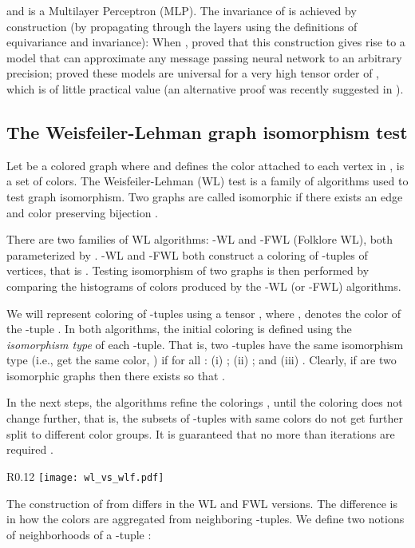 \documentclass{article}
\newcommand{\ie}{{i.e.}}
\begin{document}
and  is a Multilayer Perceptron (MLP). The invariance of  is achieved by construction (by propagating  through the layers using the definitions of equivariance and invariance):  
When , \citet{maron2018invariant} proved that this construction gives rise to a model that can approximate any message passing neural network \citep{Gilmer2017} to an arbitrary precision; \citet{maron2019universality} proved these models are universal for a very high tensor order of , which is of little practical value (an alternative proof was recently suggested in \cite{keriven2019universal}).   




\vspace{-5pt}
\subsection{The Weisfeiler-Lehman graph isomorphism test}\label{ss:WL}
\vspace{-5pt}
Let  be a colored graph where  and  defines the color attached to each vertex in ,  is a set of colors.  The Weisfeiler-Lehman (WL) test is a family of algorithms used to test graph isomorphism. Two graphs  are called isomorphic if there exists an edge and color preserving bijection . 


There are two families of WL algorithms: -WL and -FWL (Folklore WL), both parameterized by . 
-WL and -FWL both construct a coloring of -tuples of vertices, that is . Testing isomorphism of two graphs  is then performed by comparing the histograms of colors produced by the -WL (or -FWL) algorithms.

We will represent coloring of -tuples using a tensor , where ,  denotes the color of the -tuple .  In both algorithms, the initial coloring  is defined using the \emph{isomorphism type} of each -tuple. That is, two -tuples  have the same isomorphism type (\ie, get the same color, ) if for all : (i) ; (ii) ; and (iii) . Clearly, if  are two isomorphic graphs then there exists  so that  . 

In the next steps, the algorithms refine the colorings ,  until the coloring does not change further, that is, the subsets of -tuples with same colors do not get further split to different color groups. It is guaranteed that no more than  iterations are required \citep{douglas2011weisfeiler}.   

\begin{wrapfigure}[7]{R}{0.12\textwidth}
\vspace{-12pt}
\texttt{[image: wl\_vs\_wlf.pdf]}
\vspace{10pt}
\end{wrapfigure}
The construction of  from  differs in the WL and FWL versions. The difference is in how the colors are aggregated from neighboring -tuples. We define two notions of neighborhoods of a -tuple :
\end{document}
